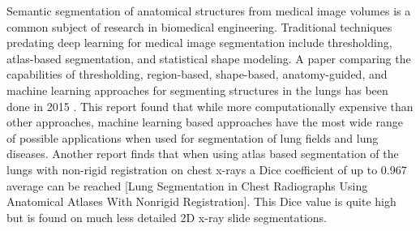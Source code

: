 
Semantic segmentation of anatomical structures from medical image volumes is a common subject of research in biomedical engineering. Traditional techniques predating deep learning for medical image segmentation include thresholding, atlas-based segmentation, and statistical shape modeling. A paper comparing the capabilities of thresholding, region-based, shape-based, anatomy-guided, and machine learning approaches for segmenting structures in the lungs has been done in 2015 \cite{comparison:article_typical}. This report found that while more computationally expensive than other approaches, machine learning based approaches have the most wide range of possible applications when used for segmentation of lung fields and lung diseases.
Another report finds that when using atlas based segmentation of the lungs with non-rigid registration on chest x-rays a Dice coefficient of up to 0.967 average can be reached [Lung Segmentation in Chest Radiographs Using Anatomical Atlases With Nonrigid Registration]. This Dice value is quite high but is found on much less detailed 2D x-ray slide segmentations.